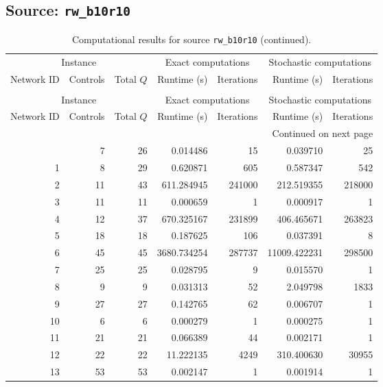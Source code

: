 \documentclass{article}
\begin{document}
\begin{landscape}
\subsection*{Source: \texttt{rw\_b10r10}}

\begin{longtable}{rrrrrrr}
\caption{Computational results for source \texttt{rw\_b10r10}.}\\
\toprule
\multicolumn{3}{c}{Instance} & \multicolumn{2}{c}{Exact computations} & \multicolumn{2}{c}{Stochastic computations} \\
\cmidrule(lr){1-3}\cmidrule(lr){4-5}\cmidrule(lr){6-7}
Network ID & Controls & Total $Q$ & Runtime (s) & Iterations & Runtime (s) & Iterations \\
\midrule
\endfirsthead
\caption[]{Computational results for source \texttt{rw\_b10r10} (continued).}\\
\toprule
\multicolumn{3}{c}{Instance} & \multicolumn{2}{c}{Exact computations} & \multicolumn{2}{c}{Stochastic computations} \\
\cmidrule(lr){1-3}\cmidrule(lr){4-5}\cmidrule(lr){6-7}
Network ID & Controls & Total $Q$ & Runtime (s) & Iterations & Runtime (s) & Iterations \\
\midrule
\endhead
\midrule
\multicolumn{7}{r}{Continued on next page} \\
\endfoot
\bottomrule
\endlastfoot
0 & 7 & 26 & 0.014486 & 15 & 0.039710 & 25 \\
1 & 8 & 29 & 0.620871 & 605 & 0.587347 & 542 \\
2 & 11 & 43 & 611.284945 & 241000 & 212.519355 & 218000 \\
3 & 11 & 11 & 0.000659 & 1 & 0.000917 & 1 \\
4 & 12 & 37 & 670.325167 & 231899 & 406.465671 & 263823 \\
5 & 18 & 18 & 0.187625 & 106 & 0.037391 & 8 \\
6 & 45 & 45 & 3680.734254 & 287737 & 11009.422231 & 298500 \\
7 & 25 & 25 & 0.028795 & 9 & 0.015570 & 1 \\
8 & 9 & 9 & 0.031313 & 52 & 2.049798 & 1833 \\
9 & 27 & 27 & 0.142765 & 62 & 0.006707 & 1 \\
10 & 6 & 6 & 0.000279 & 1 & 0.000275 & 1 \\
11 & 21 & 21 & 0.066389 & 44 & 0.002171 & 1 \\
12 & 22 & 22 & 11.222135 & 4249 & 310.400630 & 30955 \\
13 & 53 & 53 & 0.002147 & 1 & 0.001914 & 1 \\

\end{longtable}
\end{landscape}
\end{document}
